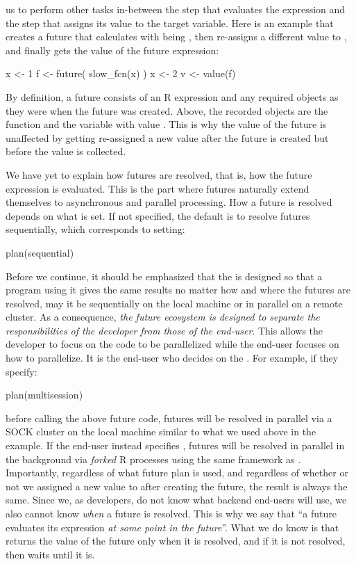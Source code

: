 us to perform other tasks in-between the step that evaluates the
expression and the step that assigns its value to the target variable.
%
Here is an example that creates a future that calculates
 with  being , then re-assigns
a different value to , and finally gets the value of the
future expression:
\begin{example}
x <- 1
f <- future({
  slow_fcn(x)
})
x <- 2
v <- value(f)
\end{example}
By definition, a future consists of an R expression and any required
objects as they were when the future was created. Above, the recorded
objects are the function  and the variable 
with value .  This is why the value of the future is
unaffected by  getting re-assigned a new value after the
future is created but before the value is collected.

We have yet to explain how futures are resolved, that is, how the
future expression is evaluated.  This is the part where futures
naturally extend themselves to asynchronous and parallel processing.
How a future is resolved depends on what  is set.
If not specified, the default is to resolve futures sequentially,
which corresponds to setting:
\begin{example}
plan(sequential)
\end{example}
Before we continue, it should be emphasized that the 
is designed so that a program using it gives the same results no
matter how and where the futures are resolved, may it be sequentially
on the local machine or in parallel on a remote cluster.  As a
consequence, \emph{the future ecosystem is designed to separate the
responsibilities of the developer from those of the end-user}.  This
allows the developer to focus on the code to be parallelized while the
end-user focuses on how to parallelize.  It is the end-user who
decides on the .  For example, if they specify:
\begin{example}
plan(multisession)
\end{example}
before calling the above future code, futures will be resolved in
parallel via a SOCK cluster on the local machine similar to what we
used above in the  example.  If the end-user instead
specifies , futures will be resolved in parallel
in the background via \emph{forked} R processes using the same
framework as .  Importantly, regardless of what
future plan is used, and regardless of whether or not we assigned a
new value to  after creating the future, the result is always
the same.  Since we, as developers, do not know what backend end-users
will use, we also cannot know \emph{when} a future is resolved.  This
is why we say that ``a future evaluates its expression \emph{at some
point in the future}''.  What we do know is that 
returns the value of the future only when it is resolved, and if it is
not resolved, then  waits until it is.

